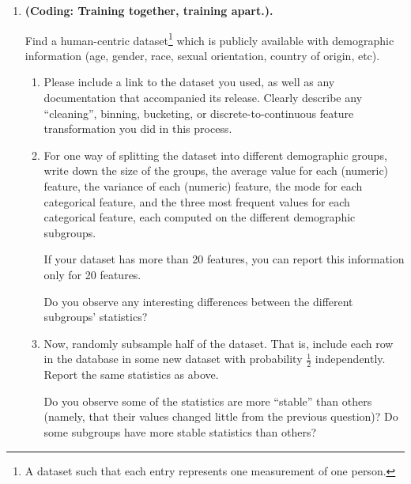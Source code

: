 \documentclass{article}
\newcommand{\dotcup}{\ensuremath{\mathaccent\cdot\cup}}
\theoremstyle{plain}
\newcommand\litem[1]{\item{\bfseries#1.\space}}
\begin{document}
\begin{enumerate}
\begin{enumerate}
  You can assume $d_x = d_y$ is the $\ell_2$ metric. 

  \item Find some $\X$, $f$, and two groups $\X_1\dotcup \X_2 = \X$
  such that the distortion of $f$ on $\X_1$ (ignoring points in $\X_2$) and
  the distortion of $\X_2$ (ignoring points in $\X_1$) are equal, but
  the best linear classifier for $\X$ has $0$ error, the best linear
  classifier for $f(\X_1)$ has error $\frac{1}{2}$, and the best
  linear classifier for $f(\X_2)$ has error $0$.
  \end{enumerate}



\litem{(Coding: Training
  together, training apart.)}

Find a human-centric dataset\footnote{A dataset such that each entry
  represents one measurement of one person.} which is publicly
available with demographic information (age, gender, race, sexual
orientation, country of origin, etc).

\begin{enumerate}
\item 

Please include a link to the dataset you used, as well as any
documentation that accompanied its release. Clearly describe any
``cleaning'', binning, bucketing, or discrete-to-continuous feature
transformation you did in this process.

\item For one way of splitting the dataset into different demographic
  groups, write down the size of the groups, the average value for
  each (numeric) feature, the variance of each (numeric) feature, the
  mode for each categorical feature, and the three most frequent
  values for each categorical feature, each computed on the different demographic subgroups.

  If your dataset has more than 20 features, you can report this information only for 20 features.

  Do you observe any interesting differences between the different subgroups' statistics?

\item Now, randomly subsample half of the dataset. That is, include
  each row in the database in some new dataset with probability
  $\frac{1}{2}$ independently.  Report the same statistics as above.

  Do you observe some of the statistics are more ``stable'' than others (namely, that their values
  changed little from the previous question)? Do some subgroups have more stable statistics than others?

  

  \end{enumerate}



  \end{enumerate}
\end{document}

